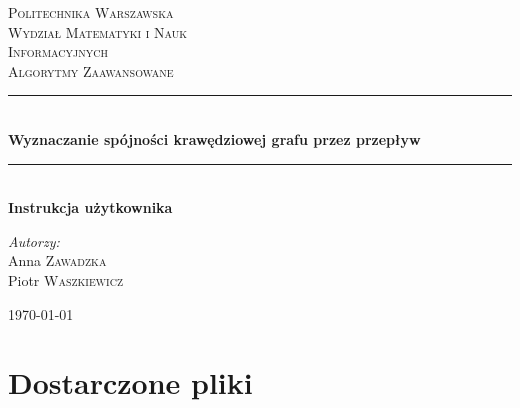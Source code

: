 \documentclass{article}
\begin{document}
	
\begin{titlepage}

\newcommand{\HRule}{\rule{\linewidth}{0.5mm}}

\center


\textsc{\LARGE Politechnika Warszawska}\\[10mm]
\textsc{\LARGE Wydział Matematyki i Nauk}\\[3mm]
\textsc{\LARGE Informacyjnych}\\[3.5cm]
 

\textsc{\Huge Algorytmy Zaawansowane}\\[0.5cm]


\HRule \\[0.4cm]
{ \LARGE \bfseries Wyznaczanie spójności krawędziowej grafu przez przepływ}\\[0.2cm]
 

\HRule \\[0.4cm]
{  \bfseries Instrukcja użytkownika}\\[2.5cm]
 

\begin{flushright}
\Large \emph{Autorzy:}\\[0.5cm]
Anna \textsc{Zawadzka}\\
Piotr \textsc{Waszkiewicz}\\[3.5cm]
\end{flushright}

\vfill
{\large \today}\\[3cm]

\end{titlepage}
	
\newpage

\section{Dostarczone pliki}
\end{document}
